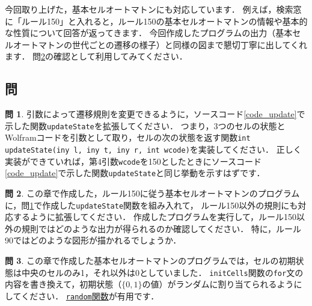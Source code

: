 \documentclass[dvipdfmx]{jsarticle}
\theoremstyle{definition}
\newtheorem{question}{問}[section]
\begin{document}
今回取り上げた，基本セルオートマトンにも対応しています．
例えば，検索窓に「ルール150」と入れると，ルール150の基本セルオートマトンの情報や基本的な性質について回答が返ってきます．
今回作成したプログラムの出力（基本セルオートマトンの世代ごとの遷移の様子）と同様の図まで懇切丁寧に出してくれます．
問\ref{que_cmpECA}の確認として利用してみてください．

\subsection{問}  \label{subsec_q}
\begin{question}
    \label{que_update_exp}
    引数によって遷移規則を変更できるように，ソースコード\ref{code_update}で示した関数\verb|updateState|を拡張してください．
    つまり，3つのセルの状態とWolframコードを引数として取り，セルの次の状態を返す関数\verb|int updateState(iny l, iny t, iny r, int wcode)|を実装してください．
    正しく実装ができていれば，第4引数\verb|wcode|を150としたときにソースコード\ref{code_update}で示した関数\verb|updateState|と同じ挙動を示すはずです．
\end{question}

\begin{question}
    \label{que_cmpECA}
    この章で作成した，ルール150に従う基本セルオートマトンのプログラムに，問\ref{que_update_exp}で作成した\verb|updateState|関数を組み入れて，
    ルール150以外の規則にも対応するように拡張してください．
    作成したプログラムを実行して，ルール150以外の規則ではどのような出力が得られるのか確認してください．
    特に，ルール90ではどのような図形が描かれるでしょうか．
\end{question}

\begin{question}
    この章で作成した基本セルオートマトンのプログラムでは，セルの初期状態は中央のセルのみ1，それ以外は0としていました．
    \verb|initCells|関数の\verb|for|文の内容を書き換えて，初期状態（$\{0,1\}$の値）がランダムに割り当てられるようにしてください．
    \href{https://processing.org/reference/random_.html}{\texttt{random}関数}が有用です．
\end{question}
\end{document}
